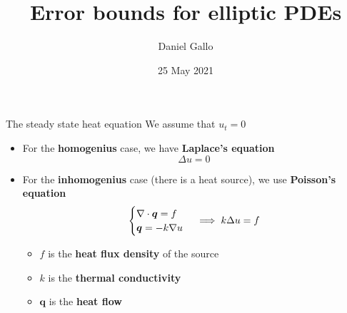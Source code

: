 \documentclass{beamer}
\title{Error bounds for elliptic PDEs}
\author{Daniel Gallo}
\institute{University of Bergen}
\date{25 May 2021}
\def\R{\mathbb{R}}
\begin{document}
    \begin{frame}
        \titlepage
    \end{frame}


    \begin{frame}{The steady state heat equation}
        We assume that $u_t = 0$
        \begin{itemize}
            \item For the \textbf{homogenius} case, we have \textbf{Laplace's equation}
            \begin{equation*}
                \Delta u = 0
            \end{equation*}
            \item For the \textbf{inhomogenius} case (there is a heat source), we use \textbf{Poisson's equation}
            \begin{equation*}
                \begin{cases}
                    \nabla \cdot \bm{q} = f \\
                    \bm{q} = -k \nabla u
                \end{cases}
                \implies
                \-k \Delta u = f
            \end{equation*}
            \begin{itemize}
                \item $f$ is the \textbf{heat flux density} of the source
                \item $k$ is the \textbf{thermal conductivity}
                \item $\bm{q}$ is the \textbf{heat flow}
            \end{itemize}
        \end{itemize}
    \end{frame}
\end{document}

